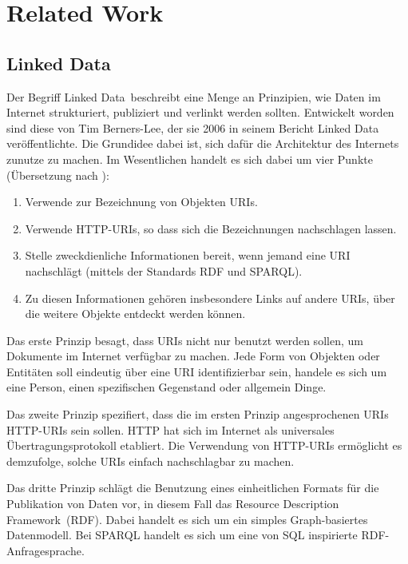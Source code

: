 \section{Related Work}


\subsection{Linked Data}

Der Begriff \glqq Linked Data\grqq \ beschreibt eine Menge an Prinzipien, wie Daten im Internet strukturiert, publiziert und verlinkt werden sollten. Entwickelt worden sind diese von Tim Berners-Lee, der sie 2006 in seinem Bericht \glqq Linked Data\grqq \ \cite{linked_data} veröffentlichte. Die Grundidee dabei ist, sich dafür die Architektur des Internets zunutze zu machen. Im Wesentlichen handelt es sich dabei um vier Punkte (Übersetzung nach \cite{wiki_linked_data}):
\begin{enumerate}
\item Verwende zur Bezeichnung von Objekten URIs.
\item Verwende HTTP-URIs, so dass sich die Bezeichnungen nachschlagen lassen.
\item Stelle zweckdienliche Informationen bereit, wenn jemand eine URI nachschlägt (mittels der Standards RDF und SPARQL).
\item Zu diesen Informationen gehören insbesondere Links auf andere URIs, über die weitere Objekte entdeckt werden können.
\end{enumerate}

Das erste Prinzip besagt, dass URIs nicht nur benutzt werden sollen, um Dokumente im Internet verfügbar zu machen. Jede Form von Objekten oder Entitäten soll eindeutig über eine URI identifizierbar sein, handele es sich um eine Person, einen spezifischen Gegenstand oder allgemein \glqq Dinge\grqq.


Das zweite Prinzip spezifiert, dass die im ersten Prinzip angesprochenen URIs HTTP-URIs sein sollen. HTTP hat sich im Internet als universales Übertragungsprotokoll etabliert. Die Verwendung von HTTP-URIs ermöglicht es demzufolge, solche URIs einfach nachschlagbar zu machen.


Das dritte Prinzip schlägt die Benutzung eines einheitlichen Formats für die Publikation von Daten vor, in diesem Fall das \glqq Resource Description Framework\grqq \ (RDF)\cite{rdf}. Dabei handelt es sich um ein simples Graph-basiertes Datenmodell. Bei SPARQL\cite{sparql} handelt es sich um eine von SQL inspirierte RDF-Anfragesprache.



